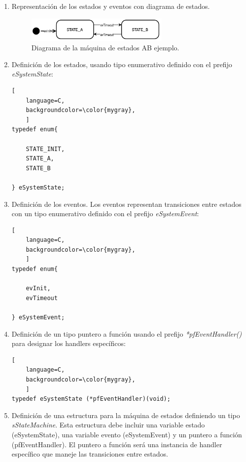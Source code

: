 \begin{enumerate}
\item Representación de los estados y eventos con diagrama de estados.
\begin{figure}[ht]
	\centering
	\includegraphics[width=0.66\textwidth]{./Figures/statemachineAB.png}
	\caption{Diagrama de la máquina de estados AB ejemplo.}
	\label{fig:fsmAB}
\end{figure}

\item Definición de los estados, usando tipo enumerativo definido con el prefijo \textit{eSystemState}:

\begin{lstlisting}[
	language=C, 
	backgroundcolor=\color{mygray},
	]
typedef enum{

    STATE_INIT,
	STATE_A,
	STATE_B

} eSystemState;
\end{lstlisting}

\item Definición de los eventos. Los eventos representan transiciones entre estados con un tipo enumerativo definido con el prefijo \textit{eSystemEvent}:

\begin{lstlisting}[
	language=C, 
	backgroundcolor=\color{mygray},
	]
typedef enum{

	evInit,
	evTimeout

} eSystemEvent;
\end{lstlisting}

\item Definición de un tipo puntero a función usando el prefijo \textit{*pfEventHandler()} para designar los handlers específicos:

\begin{lstlisting}[
	language=C, 
	backgroundcolor=\color{mygray},
	]
typedef eSystemState (*pfEventHandler)(void);
\end{lstlisting}

\item Definición de una estructura para la máquina de estados definiendo un tipo \textit{sStateMachine}. Esta estructura debe incluir una variable estado (eSystemState), una variable evento (eSystemEvent) y un puntero a función (pfEventHandler). El puntero a función será una instancia de handler específico que maneje las transiciones entre estados. 


\end{enumerate}
